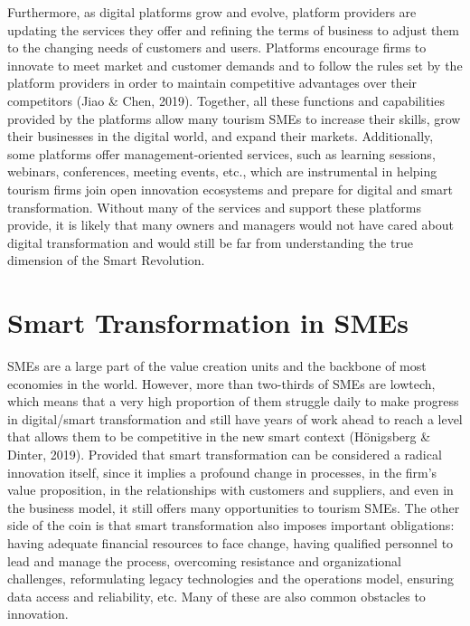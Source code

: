 \documentclass[
  letterpaper,
  DIV=11,
  numbers=noendperiod]{scrreprt}
\begin{document}
Furthermore, as digital platforms grow and evolve, platform providers
are updating the services they offer and refining the terms of business
to adjust them to the changing needs of customers and users. Platforms
encourage firms to innovate to meet market and customer demands and to
follow the rules set by the platform providers in order to maintain
competitive advantages over their competitors (Jiao \& Chen, 2019).
Together, all these functions and capabilities provided by the platforms
allow many tourism SMEs to increase their skills, grow their businesses
in the digital world, and expand their markets. Additionally, some
platforms offer management-oriented services, such as learning sessions,
webinars, conferences, meeting events, etc., which are instrumental in
helping tourism firms join open innovation ecosystems and prepare for
digital and smart transformation. Without many of the services and
support these platforms provide, it is likely that many owners and
managers would not have cared about digital transformation and would
still be far from understanding the true dimension of the Smart
Revolution.

\hypertarget{smart-transformation-in-smes}{%
\section{Smart Transformation in
SMEs}\label{smart-transformation-in-smes}}

SMEs are a large part of the value creation units and the backbone of
most economies in the world. However, more than two-thirds of SMEs are
lowtech, which means that a very high proportion of them struggle daily
to make progress in digital/smart transformation and still have years of
work ahead to reach a level that allows them to be competitive in the
new smart context (Hönigsberg \& Dinter, 2019). Provided that smart
transformation can be considered a radical innovation itself, since it
implies a profound change in processes, in the firm's value proposition,
in the relationships with customers and suppliers, and even in the
business model, it still offers many opportunities to tourism SMEs. The
other side of the coin is that smart transformation also imposes
important obligations: having adequate financial resources to face
change, having qualified personnel to lead and manage the process,
overcoming resistance and organizational challenges, reformulating
legacy technologies and the operations model, ensuring data access and
reliability, etc. Many of these are also common obstacles to innovation.
\end{document}
